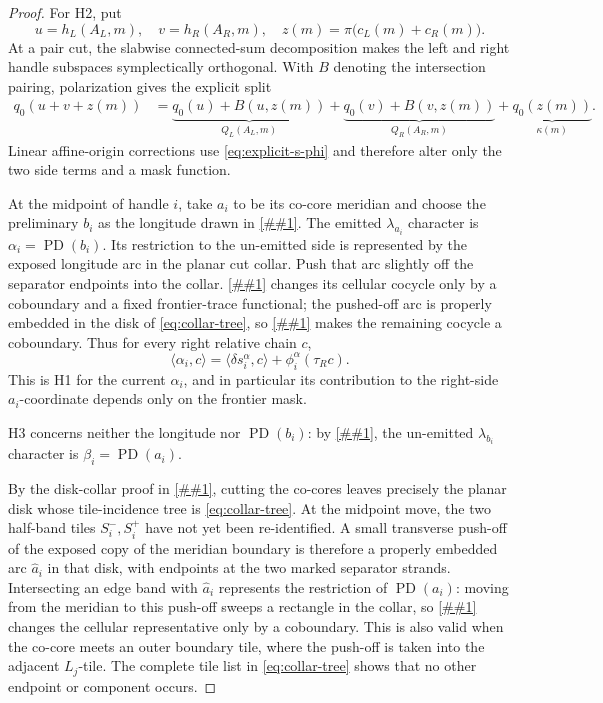 \documentclass[11pt]{article}
\newcommand{\cref}[1]{\autoref{##1}}%
\begin{document}
\begin{proof}
For H2, put
\[
 u=h_L(A_L,m),\quad v=h_R(A_R,m),\quad
 z(m)=\pi\bigl(c_L(m)+c_R(m)\bigr).
\]
At a pair cut, the slabwise connected-sum decomposition makes the left and
right handle subspaces symplectically orthogonal.  With \(B\) denoting the
intersection pairing, polarization gives the explicit split
\begin{align}
 q_0(u+v+z(m))
 &=\underbrace{q_0(u)+B(u,z(m))}_{Q_L(A_L,m)}
  +\underbrace{q_0(v)+B(v,z(m))}_{Q_R(A_R,m)}
  +\underbrace{q_0(z(m))}_{\kappa(m)}.              \label{eq:grid-H2}
\end{align}
Linear affine-origin corrections use \eqref{eq:explicit-s-phi} and therefore
alter only the two side terms and a mask function.

At the midpoint of handle \(i\), take \(a_i\) to be its co-core meridian and
choose the preliminary \(b_i\) as the longitude drawn in
\cref{fig:slab-cocores}.  The emitted \(\lambda_{a_i}\) character is
\(\alpha_i=\operatorname{PD}(b_i)\).  Its restriction to the un-emitted side
is represented by the exposed longitude arc in the planar cut collar.  Push
that arc slightly off the separator endpoints into the collar.
\cref{lem:collar-push-off} changes its cellular cocycle only by a coboundary and a fixed
frontier-trace functional; the pushed-off arc is properly embedded in the
disk of \eqref{eq:collar-tree}, so \cref{lem:planar-arc} makes the remaining
cocycle a coboundary.  Thus for every right relative chain \(c\),
\begin{equation}\label{eq:midpoint-alpha-H1}
 \langle\alpha_i,c\rangle
   =\langle\delta s_i^{\alpha},c\rangle
      +\phi_i^{\alpha}(\tau_Rc).
\end{equation}
This is H1 for the current \(\alpha_i\), and in particular its contribution
to the right-side \(a_i\)-coordinate depends only on the frontier mask.

H3 concerns neither the longitude nor
\(\operatorname{PD}(b_i)\): by \cref{eq:dual-character-table}, the
un-emitted \(\lambda_{b_i}\) character is
\(\beta_i=\operatorname{PD}(a_i)\).

By the disk-collar proof in \cref{lem:canonical}, cutting the co-cores leaves
precisely the planar disk whose tile-incidence tree is
\eqref{eq:collar-tree}.  At the midpoint move, the two half-band tiles
\(S_i^-,S_i^+\) have not yet been re-identified.  A small transverse
push-off of the exposed copy of the meridian boundary is therefore a
properly embedded arc \(\widehat a_i\) in that disk, with endpoints at the
two marked separator strands.  Intersecting an edge band with
\(\widehat a_i\) represents the restriction of
\(\operatorname{PD}(a_i)\): moving from the meridian to this push-off sweeps
a rectangle in the collar, so \cref{lem:collar-push-off} changes the cellular
representative only by a coboundary.  This is also valid when
the co-core meets an outer boundary tile, where the push-off is taken into
the adjacent \(L_j\)-tile.  The complete tile list in
\eqref{eq:collar-tree} shows that no other endpoint or component occurs.


\end{proof}
\end{document}
